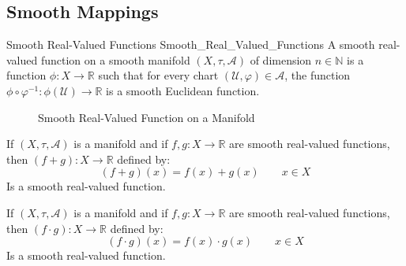 \documentclass[oneside]{book}                                                  %
\begin{document}
            \subsection{Smooth Mappings}
                \begin{fdefinition}{Smooth Real-Valued Functions}
                                   {Smooth_Real_Valued_Functions}
                    A smooth real-valued function on a smooth manifold
                    $(X,\tau,\mathcal{A})$ of dimension $n\in\mathbb{N}$ is a
                    function $\phi:X\rightarrow\mathbb{R}$ such that for every
                    chart $(\mathcal{U},\varphi)\in\mathcal{A}$, the function
                    $\phi\circ\varphi^{\minus{1}}:\phi(\mathcal{U})%
                     \rightarrow\mathbb{R}$ is a smooth Euclidean function.
                \end{fdefinition}
                \begin{figure}[H]
                    \centering
                    \captionsetup{type=figure}
                    
                    \caption{Smooth Real-Valued Function on a Manifold}
                \end{figure}
                \begin{theorem}
                    If $(X,\tau,\mathcal{A})$ is a manifold and if
                    $f,g:X\rightarrow\mathbb{R}$ are smooth real-valued functions,
                    then $(f+g):X\rightarrow\mathbb{R}$ defined by:
                    \begin{equation}
                        (f+g)(x)=f(x)+g(x)
                        \quad\quad
                        x\in{X}
                    \end{equation}
                    Is a smooth real-valued function.
                \end{theorem}
                \begin{theorem}
                    If $(X,\tau,\mathcal{A})$ is a manifold and if
                    $f,g:X\rightarrow\mathbb{R}$ are smooth real-valued functions,
                    then $(f\cdot{g}):X\rightarrow\mathbb{R}$ defined by:
                    \begin{equation}
                        (f\cdot{g})(x)=f(x)\cdot{g}(x)
                        \quad\quad
                        x\in{X}
                    \end{equation}
                    Is a smooth real-valued function.
                \end{theorem}
\end{document}
